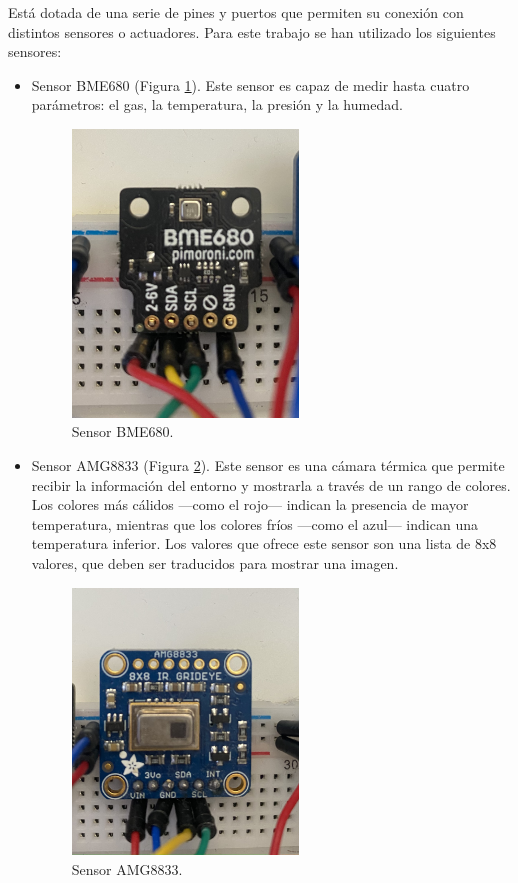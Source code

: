 Está dotada de una serie de pines y puertos que permiten su conexión con distintos sensores o actuadores. Para este trabajo se han utilizado los siguientes sensores:
\begin{itemize}
\item{Sensor BME680 (Figura \ref{fig:bme}).} Este sensor es capaz de medir hasta cuatro parámetros: el gas, la temperatura, la presión y la humedad.
\begin{figure} [h!]
  \begin{center}
    \includegraphics[width=6cm]{figs/bme}
  \end{center}
  \caption{Sensor BME680.}
  \label{fig:bme}
\end{figure}

\item{Sensor AMG8833 (Figura \ref{fig:amg}).} Este sensor es una cámara térmica que permite recibir la información del entorno y mostrarla a través de un rango de colores. Los colores más cálidos ---como el rojo--- indican la presencia de mayor temperatura, mientras que los colores fríos ---como el azul--- indican una temperatura inferior. Los valores que ofrece este sensor son una lista de 8x8 valores, que deben ser traducidos para mostrar una imagen.
\begin{figure} [h!]
  \begin{center}
    \includegraphics[width=6cm]{figs/amg}
  \end{center}
  \caption{Sensor AMG8833.}
  \label{fig:amg}
\end{figure}


\end{itemize}
